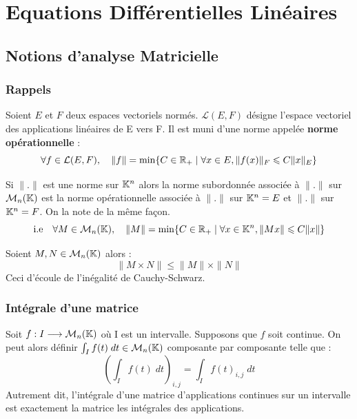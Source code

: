 \chapter{Equations Différentielles Linéaires}


\setlength{\parindent}{0pt}
\renewcommand{\labelitemi}{\textbullet} %


\section{Notions d'analyse Matricielle}

\subsection{Rappels}

Soient $E$ et $F$ deux espaces vectoriels normés. $ \mathcal{L}(E,F)$ désigne l'espace vectoriel des applications linéaires 
de E vers F. Il est muni d'une norme appelée \textbf{norme opérationnelle} : 
    \[ \forall f \in \mathcal{L}(E,F), \quad \| f \| = \min \{ C \in \mathbb{R}_+ \; | \; \forall x \in E, \| f(x) \|_F \leqslant C \| x \|_E \} \]

\begin{definition}
    Si $\|.\|$ est une norme sur $\mathbb{K}^n$ alors la norme subordonnée associée à $\|.\|$ sur $ \mathcal{M}_n(\mathbb{K})$ est 
    la norme opérationnelle associée à $\|.\|$ sur $\mathbb{K}^n = E$ et $\|.\|$ sur $\mathbb{K}^n = F$. On la note de la même façon. 
    \[ \text{i.e} \quad \forall M \in \mathcal{M}_n(\mathbb{K}), \quad  \| M \| = \min \{ C \in \mathbb{R}_+ \; | \; \forall x \in \mathbb{K}^n, \| Mx \| \leqslant C \| x \| \} \]
\end{definition}

\begin{proposition}
    Soient $M,N \in \mathcal{M}_n(\mathbb{K})$ alors :
        \[ \| M \times N \| \leqslant \|M\| \times \|N\| \]
    Ceci d'écoule de l'inégalité de Cauchy-Schwarz. 
\end{proposition}

\subsection{Intégrale d'une matrice}

\begin{remark}
    Soit $f : I \longrightarrow \mathcal{M}_n(\mathbb{K})$ où I est un intervalle. Supposons que $f$ soit continue. 
    On peut alors définir $ \int_I f(t) \; dt \in \mathcal{M}_n(\mathbb{K})$ composante par composante telle que :
        \[ \left( \int_I f(t) \; dt \right)_{i,j} = \int_I f(t)_{i,j} \; dt \] 
    Autrement dit, l'intégrale d'une matrice d'applications continues sur un intervalle est exactement la matrice 
    les intégrales des applications. 
\end{remark}

